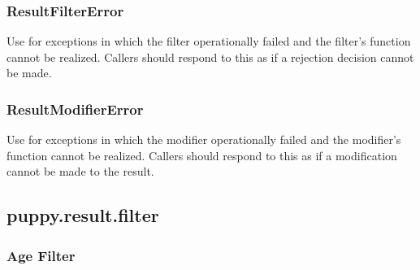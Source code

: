 \documentclass[letterpaper,10pt,english]{sphinxmanual}
\begin{document}
\subsubsection{ResultFilterError}
\label{api2.0:resultfiltererror}

\begin{fulllineitems}
\label{api2.0:puppy.result.exceptions.ResultFilterError}
Use for exceptions in which the filter operationally failed and the
filter's function cannot be realized. Callers should respond to this as if
a rejection decision cannot be made.

\end{fulllineitems}



\subsubsection{ResultModifierError}
\label{api2.0:resultmodifiererror}

\begin{fulllineitems}
\label{api2.0:puppy.result.exceptions.ResultModifierError}
Use for exceptions in which the modifier operationally failed and the
modifier's function cannot be realized. Callers should respond to this as if
a modification cannot be made to the result.

\end{fulllineitems}



\subsection{puppy.result.filter}
\label{api2.0:puppy-result-filter}\label{api2.0:module-puppy.result.filter}

\subsubsection{Age Filter}
\label{api2.0:age-filter}
\end{document}
